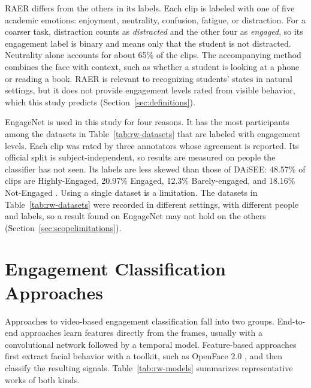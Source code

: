 RAER \cite{zhao2025} differs from the others in its labels. Each clip is labeled with one of five academic emotions: enjoyment, neutrality, confusion, fatigue, or distraction. For a coarser task, distraction counts as \emph{distracted} and the other four as \emph{engaged}, so its engagement label is binary and means only that the student is not distracted. Neutrality alone accounts for about 65\% of the clips. The accompanying method combines the face with context, such as whether a student is looking at a phone or reading a book. RAER is relevant to recognizing students' states in natural settings, but it does not provide engagement levels rated from visible behavior, which this study predicts (Section~\ref{sec:definitions}).

EngageNet \cite{singh2023} is used in this study for four reasons. It has the most participants among the datasets in Table~\ref{tab:rw-datasets} that are labeled with engagement levels. Each clip was rated by three annotators whose agreement is reported. Its official split is subject-independent, so results are measured on people the classifier has not seen. Its labels are less skewed than those of DAiSEE: 48.57\% of clips are Highly-Engaged, 20.97\% Engaged, 12.3\% Barely-engaged, and 18.16\% Not-Engaged \cite{singh2023}. Using a single dataset is a limitation. The datasets in Table~\ref{tab:rw-datasets} were recorded in different settings, with different people and labels, so a result found on EngageNet may not hold on the others (Section~\ref{sec:scopelimitations}).



\section{Engagement Classification Approaches}
\label{sec:rw-models}

Approaches to video-based engagement classification fall into two groups. End-to-end approaches learn features directly from the frames, usually with a convolutional network followed by a temporal model. Feature-based approaches first extract facial behavior with a toolkit, such as OpenFace 2.0 \cite{baltrusaitis2018}, and then classify the resulting signals. Table~\ref{tab:rw-models} summarizes representative works of both kinds.

